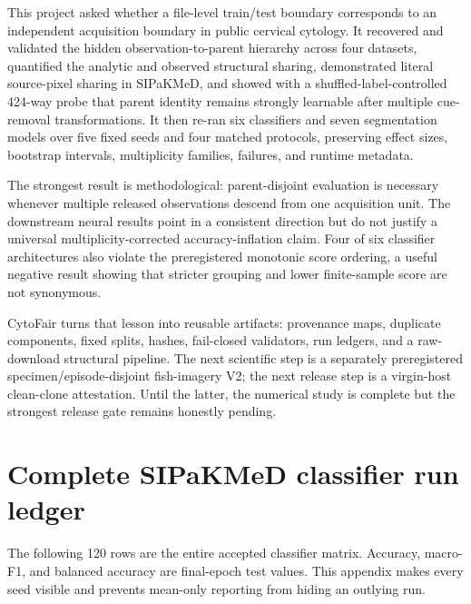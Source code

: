 \documentclass[11pt,oneside]{report}
\begin{document}
This project asked whether a file-level train/test boundary corresponds to an independent acquisition boundary in public cervical cytology. It recovered and validated the hidden observation-to-parent hierarchy across four datasets, quantified the analytic and observed structural sharing, demonstrated literal source-pixel sharing in SIPaKMeD, and showed with a shuffled-label-controlled 424-way probe that parent identity remains strongly learnable after multiple cue-removal transformations. It then re-ran six classifiers and seven segmentation models over five fixed seeds and four matched protocols, preserving effect sizes, bootstrap intervals, multiplicity families, failures, and runtime metadata.

The strongest result is methodological: parent-disjoint evaluation is necessary whenever multiple released observations descend from one acquisition unit. The downstream neural results point in a consistent direction but do not justify a universal multiplicity-corrected accuracy-inflation claim. Four of six classifier architectures also violate the preregistered monotonic score ordering, a useful negative result showing that stricter grouping and lower finite-sample score are not synonymous.

CytoFair turns that lesson into reusable artifacts: provenance maps, duplicate components, fixed splits, hashes, fail-closed validators, run ledgers, and a raw-download structural pipeline. The next scientific step is a separately preregistered specimen/episode-disjoint fish-imagery V2; the next release step is a virgin-host clean-clone attestation. Until the latter, the numerical study is complete but the strongest release gate remains honestly pending.

\appendix

\chapter{Complete SIPaKMeD classifier run ledger}

The following 120 rows are the entire accepted classifier matrix. Accuracy, macro-F1, and balanced accuracy are final-epoch test values. This appendix makes every seed visible and prevents mean-only reporting from hiding an outlying run.

\begin{landscape}
\footnotesize
\setlength{\tabcolsep}{3pt}

\end{landscape}
\end{document}
